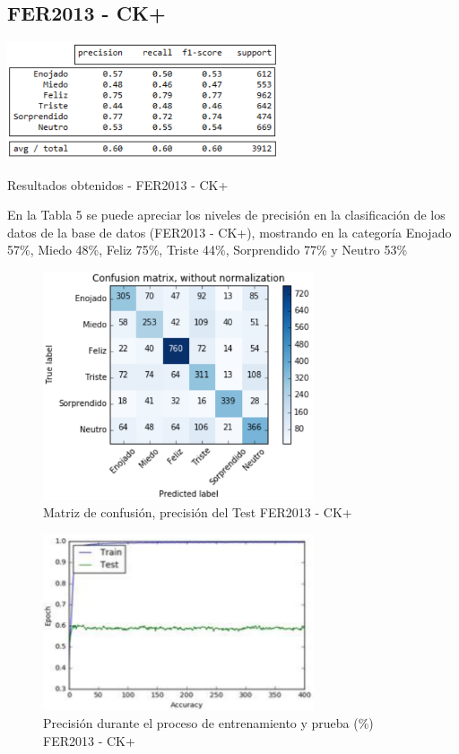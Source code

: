 \subsection{FER2013 - CK+}


\begin{table}[H]
    \centering
    \includegraphics[width=80mm]{./Imagenes/tabla_resultados_fer_ck+.png} 
    \caption{Resultados obtenidos - FER2013 - CK+}
    \label{tab:tabla_resultados_fer_ck+}
\end{table}

En la Tabla 5 se puede apreciar los niveles de precisión en la clasificación de los
datos de la base de datos (FER2013 - CK+), mostrando en la categoría Enojado 57\%,
Miedo 48\%, Feliz 75\%, Triste 44\%, Sorprendido 77\% y Neutro 53\%

\begin{figure}[H]
		\centering
		\includegraphics[width=80mm]{./Imagenes/matriz_confusion_fer_ck+.png}
		\caption{Matriz de confusión, precisión del Test FER2013 - CK+}
		\label{fig:matriz_confusion_fer_ck+}
\end{figure}

\begin{figure}[H]
		\centering
		\includegraphics[width=80mm]{./Imagenes/precision_fer_ck+.png}
		\caption{Precisión durante el proceso de entrenamiento y prueba (\%) FER2013 - CK+}
		\label{fig:precision_fer_ck+}
\end{figure}

